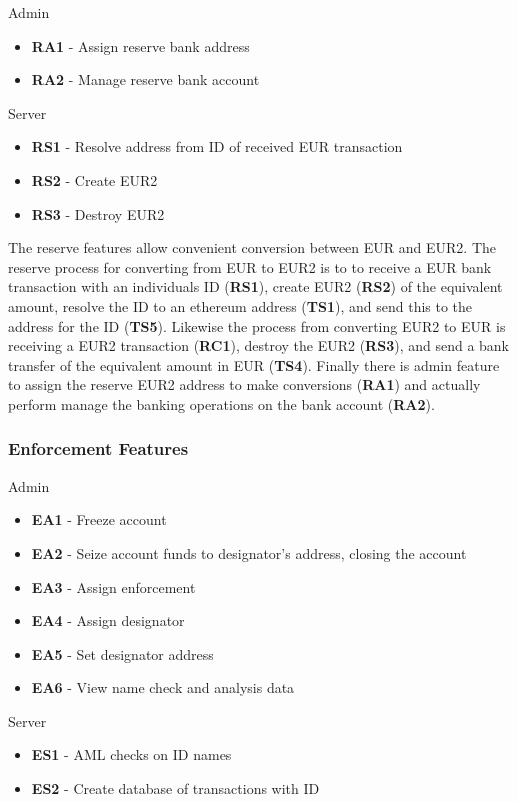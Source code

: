 \documentclass[a4paper,12pt]{article} %
\begin{document}
{{Admin
\begin{itemize}
	\item \textbf{RA1} - Assign reserve bank address
	\item \textbf{RA2} - Manage reserve bank account
\end{itemize}

Server
\begin{itemize}
	\item \textbf{RS1} - Resolve address from ID of received EUR transaction
	\item \textbf{RS2} - Create EUR2
	\item \textbf{RS3} - Destroy EUR2
\end{itemize}

The reserve features allow convenient conversion between EUR and EUR2. The reserve process for converting from EUR to EUR2 is to to receive a EUR bank transaction with an individuals ID (\textbf{RS1}), create EUR2 (\textbf{RS2}) of the equivalent amount, resolve the ID to an ethereum address (\textbf{TS1}), and send this to the address for the ID (\textbf{TS5}).  Likewise the process from converting EUR2 to EUR is receiving a EUR2 transaction (\textbf{RC1}), destroy the EUR2 (\textbf{RS3}), and send a bank transfer of the equivalent amount in EUR (\textbf{TS4}). Finally there is admin feature to assign the reserve EUR2 address to make conversions (\textbf{RA1}) and actually perform manage the banking operations on the bank account (\textbf{RA2}).

\subsubsection{Enforcement Features} \label{sssec:3.3:enforcement}

Admin
\begin{itemize}
	\item \textbf{EA1} - Freeze account
	\item \textbf{EA2} - Seize account funds to designator's address, closing the account
	\item \textbf{EA3} - Assign enforcement
	\item \textbf{EA4} - Assign designator
	\item \textbf{EA5} - Set designator address
	\item \textbf{EA6} - View name check and analysis data
\end{itemize}

Server
\begin{itemize}
	\item \textbf{ES1} - AML checks on ID names
	\item \textbf{ES2} - Create database of transactions with ID
\end{itemize}

}}
\end{document}
